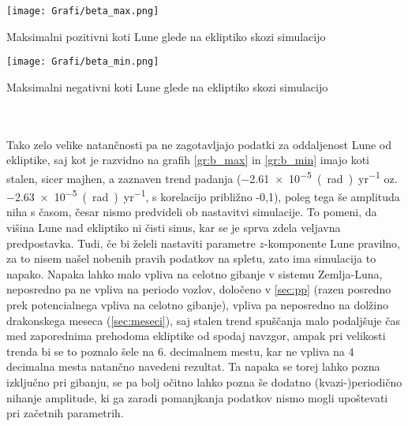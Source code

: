 \documentclass{article}
\begin{document}
\begin{minipage}[t]{0.45\textwidth}
    \begin{graph}
        \centering
        \texttt{[image: Grafi/beta\_max.png]}
        \captionsetup{width=0.8\linewidth}
        \caption{Maksimalni pozitivni koti Lune glede na ekliptiko skozi simulacijo}
        \label{gr:b_max}
    \end{graph}
\end{minipage}\begin{minipage}[t]{0.45\textwidth}
    \begin{graph}
        \centering
        \texttt{[image: Grafi/beta\_min.png]}
        \captionsetup{width=0.8\linewidth}
        \caption{Maksimalni negativni koti Lune glede na ekliptiko skozi simulacijo}
        \label{gr:b_min}
    \end{graph}
\end{minipage}\\\\

Tako zelo velike natančnosti pa ne zagotavljajo podatki za oddaljenost Lune od ekliptike, saj kot je razvidno na grafih \ref{gr:b_max} in \ref{gr:b_min} imajo koti stalen, sicer majhen, a zaznaven trend padanja (\SI{-2,61e-5}{(rad)\per yr} oz. \SI{-2,63e-5}{(rad)\per yr}, s korelacijo približno {-0,1}), poleg tega še amplituda niha s časom, česar nismo predvideli ob nastavitvi simulacije. To pomeni, da višina Lune nad ekliptiko ni čisti sinus, kar se je sprva zdela veljavna predpostavka. Tudi, če bi želeli nastaviti parametre $z$-komponente Lune pravilno, za to nisem našel nobenih pravih podatkov na spletu, zato ima simulacija to napako. Napaka lahko malo vpliva na celotno gibanje v sistemu Zemlja-Luna, neposredno pa ne vpliva na periodo vozlov, določeno v \ref{sec:pp} (razen posredno prek potencialnega vpliva na celotno gibanje), vpliva pa neposredno na dolžino drakonskega meseca (\ref{sec:meseci}), saj stalen trend spuščanja malo podaljšuje čas med zaporednima prehodoma ekliptike od spodaj navzgor, ampak pri velikosti trenda bi se to poznalo šele na 6. decimalnem mestu, kar ne vpliva na 4 decimalna mesta natančno navedeni rezultat. Ta napaka se torej lahko pozna izključno pri gibanju, se pa bolj očitno lahko pozna še dodatno (kvazi-)periodično nihanje amplitude, ki ga zaradi pomanjkanja podatkov nismo mogli upoštevati pri začetnih parametrih.\label{sec:t_o}
\end{document}

